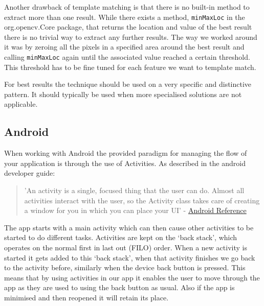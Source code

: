 Another drawback of template matching is that there is no built-in method to extract more than one result. While there exists a method, \verb!minMaxLoc! in the org.opencv.Core package, that returns the location and value of the best result there is no trivial way to extract any further results. The way we worked around it was by zeroing all the pixels in a specified area around the best result and calling \verb!minMaxLoc! again until the associated value reached a certain threshold. This threshold has to be fine tuned for each feature we want to template match.

For best results the technique should be used on a very specific and distinctive pattern. It should typically be used when more specialised solutions are not applicable.

    \subsection{Android}
When working with Android the provided paradigm for managing the flow of your application is through the use of Activities. As described in the android developer guide:

\begin{quote} 'An activity is a single, focused thing that the user can do. Almost all activities interact with the user, so the Activity class takes care of creating a window for you in which you can place your UI' - \href{http://developer.android.com/reference/android/app/Activity.html}{Android Reference}
\end{quote}  

The app starts with a main activity which can then cause other activities to be started to do different tasks. Activities are kept on the ‘back stack’, which operates on the normal first in last out (FILO) order. When a new activity is started it gets added to this ‘back stack’, when that activity finishes we go back to the activity before, similarly when the device back button is pressed. This means that by using
activities in our app it enables the user to move through the app as they are used to using the back button as usual. Also if the app is minimised and then reopened it will retain its place.


